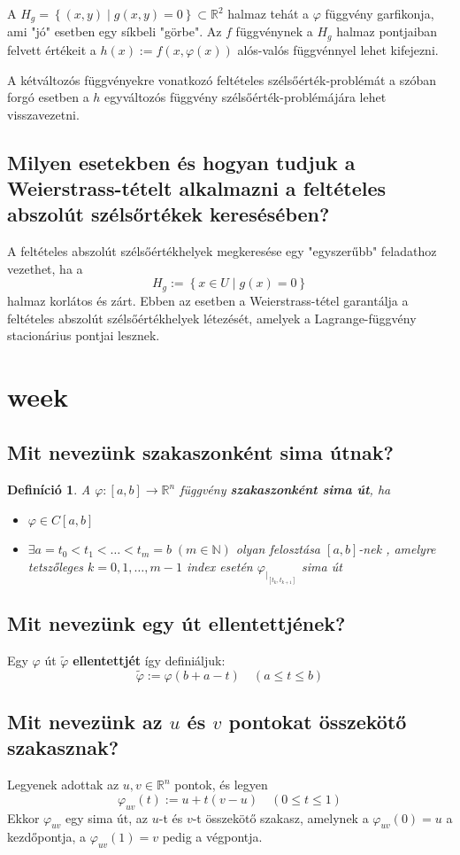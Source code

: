 \documentclass[12pt,a4paper]{article}
\newcommand{\R}{\mathbb{R}}
\newcommand{\N}{\mathbb{N}}
\newcommand{\f}{\varphi}
\newcommand{\braces}[1]{\left\lbrace #1 \right\rbrace}
\newcommand{\boxes}[1]{\left[ #1 \right]}
\newtheorem{defi}{Definíció}[section]
\begin{document}
A $H_g = \braces{(x,y) \mid g(x,y) = 0} \subset \R^2$ halmaz tehát a $\f$ függvény garfikonja, ami "jó" esetben egy síkbeli "görbe". Az $f$ függvénynek a $H_g$ halmaz pontjaiban felvett értékeit a $h(x) := f(x,\f(x))$ alós-valós függvénnyel lehet kifejezni.

A kétváltozós függvényekre vonatkozó feltételes szélsőérték-problémát a szóban forgó esetben a $h$ egyváltozós függvény szélsőérték-problémájára lehet visszavezetni.
\subsection{Milyen esetekben és hogyan tudjuk a Weierstrass-tételt alkalmazni a feltételes abszolút szélsőrtékek keresésében?}
A feltételes abszolút szélsőértékhelyek megkeresése
egy "egyszerűbb" feladathoz vezethet, ha a
\[
H_g := \braces{x\in U \mid g(x) = 0}
\]
halmaz korlátos és zárt. Ebben az esetben a Weierstrass-tétel
garantálja a feltételes abszolút szélsőértékhelyek létezését, amelyek a Lagrange-függvény stacionárius pontjai lesznek.
\newpage
\section{week}
\subsection{Mit nevezünk szakaszonként sima útnak?}
\begin{defi}
A $\f : \boxes{a,b} \to \R^n$ függvény \textbf{szakaszonként sima
út}, ha
\begin{itemize}
\item $\f \in C \boxes{a,b}$
\item $\exists a = t_0 < t_ 1 < \ldots < t_m = b \; (m \in \N )$  olyan felosztása $\boxes{a,b}$-nek , amelyre tetszőleges $k = 0,1,\ldots,m-1$ index esetén $\f_{\vert_{\boxes{t_k,t_{k+1}}}}$ sima út
\end{itemize}
\end{defi}
\subsection{Mit nevezünk egy út ellentettjének?}
Egy $\f$ út $\tilde{\f}$ \textbf{ellentettjét} így definiáljuk:
\[
\tilde{\f} := \f(b+a-t) \quad (a \leq t \leq b)
\]
\subsection{Mit nevezünk az $u$ és $v$ pontokat összekötő szakasznak?}
Legyenek adottak az $u,v \in \R^n$  pontok, és legyen
\[
\f_{uv}(t) := u+t(v-u) \quad (0 \leq t \leq 1)
\]
Ekkor $\f_{uv}$ egy sima út, az $u$-t és $v$-t összekötő szakasz, amelynek a $\f_{uv}(0) = u$ a kezdőpontja, a $\f_{uv}(1) = v$ pedig a végpontja.
\end{document}
